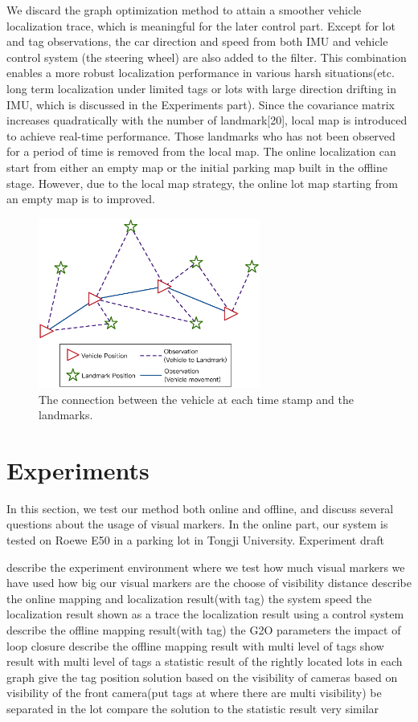 \documentclass[journal]{IEEEtran}
\begin{document}
We discard the graph optimization method to attain a smoother vehicle localization trace, which is meaningful for the later control part. Except for lot and tag observations, the car direction and speed from both IMU and vehicle control system (the steering wheel) are also added to the filter. This combination enables a more robust localization performance in various harsh situations(etc. long term localization under limited tags or lots with large direction drifting in IMU, which is discussed in the Experiments part). Since the covariance matrix increases quadratically with the number of landmark[20], local map is introduced to achieve real-time performance. Those landmarks who has not been observed for a period of time is removed from the local map. The online localization can start from either an empty map or the initial parking map built in the offline stage. However, due to the local map strategy, the online lot map starting from an empty map is to improved.

\begin{figure}
\centering
\includegraphics[height = 2.2in]{fig9_Optimize}
\caption{
The connection between the vehicle at each time stamp and the landmarks.
}\label{fig:9}
\end{figure}



\section{Experiments}
In this section, we test our method both online and offline, and discuss several questions about the usage of visual markers. In the online part, our system is tested on Roewe E50 in a parking lot in Tongji University.
Experiment draft

describe the experiment environment
where we test
how much visual markers we have used
how big our visual markers are the choose of visibility distance 
describe the online mapping and localization result(with tag)
the system speed
the localization result shown as a trace
the localization result using a control system
describe the offline mapping result(with tag)
the G2O parameters
the impact of loop closure
describe the offline mapping result with multi level of tags
show result with multi level of tags
a statistic result of the rightly located lots in each graph
give the  tag position solution based on the visibility of cameras
based on visibility of the front camera(put tags at where there are multi visibility)
be separated in the lot
compare the solution to the statistic result
very similar
\end{document}
